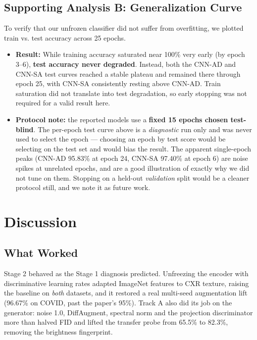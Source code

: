 \documentclass[11pt]{article}
\begin{document}
\subsection{Supporting Analysis B: Generalization Curve}
To verify that our unfrozen classifier did not suffer from overfitting, we plotted train vs. test accuracy across 25 epochs.
\begin{itemize}[nosep, leftmargin=1.5em]
  \item \textbf{Result:} While training accuracy saturated near 100\% very early (by epoch 3--6), \textbf{test accuracy never degraded}. Instead, both the CNN-AD and CNN-SA test curves reached a stable plateau and remained there through epoch 25, with CNN-SA consistently resting above CNN-AD. Train saturation did not translate into test degradation, so early stopping was not required for a valid result here.
  \item \textbf{Protocol note:} the reported models use a \textbf{fixed 15 epochs chosen test-blind}. The per-epoch test curve above is a \emph{diagnostic} run only and was never used to select the epoch --- choosing an epoch by test score would be selecting on the test set and would bias the result. The apparent single-epoch peaks (CNN-AD 95.83\% at epoch 24, CNN-SA 97.40\% at epoch 6) are noise spikes at unrelated epochs, and are a good illustration of exactly why we did not tune on them. Stopping on a held-out \emph{validation} split would be a cleaner protocol still, and we note it as future work.
\end{itemize}


\section{Discussion} \label{sec:discussion}

\subsection{What Worked}
Stage 2 behaved as the Stage 1 diagnosis predicted. Unfreezing the encoder with discriminative learning rates adapted ImageNet features to CXR texture, raising the baseline on \emph{both} datasets, and it restored a real multi-seed augmentation lift (96.67\% on COVID, past the paper's 95\%). Track A also did its job on the generator: noise 1.0, DiffAugment, spectral norm and the projection discriminator more than halved FID and lifted the transfer probe from 65.5\% to 82.3\%, removing the brightness fingerprint.
\end{document}
